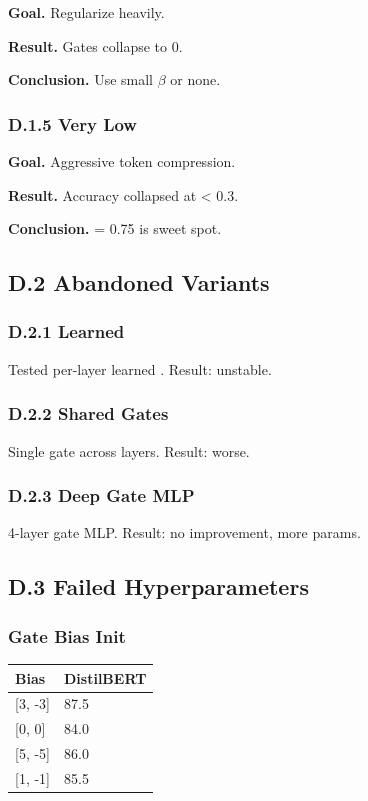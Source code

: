 \textbf{Goal.} Regularize heavily.

\textbf{Result.} Gates collapse to 0.

\textbf{Conclusion.} Use small $\beta$ or none.

\subsubsection{D.1.5 Very Low}

\textbf{Goal.} Aggressive token compression.

\textbf{Result.} Accuracy collapsed at   < 0.3.

\textbf{Conclusion.}   = 0.75 is sweet spot.

\subsection{D.2 Abandoned Variants}

\subsubsection{D.2.1 Learned}

Tested per-layer learned  . Result: unstable.

\subsubsection{D.2.2 Shared Gates}

Single gate across layers. Result: worse.

\subsubsection{D.2.3 Deep Gate MLP}

4-layer gate MLP. Result: no improvement, more params.

\subsection{D.3 Failed Hyperparameters}

\subsubsection{Gate Bias Init}

\begin{table}[H]
\centering
\small
\begin{tabular}{ll}
\toprule
\textbf{Bias} & \textbf{DistilBERT} \\
\midrule
{[3, -3]} & 87.5 \\
{[0, 0]} & 84.0 \\
{[5, -5]} & 86.0 \\
{[1, -1]} & 85.5 \\
\bottomrule
\end{tabular}
\end{table}

